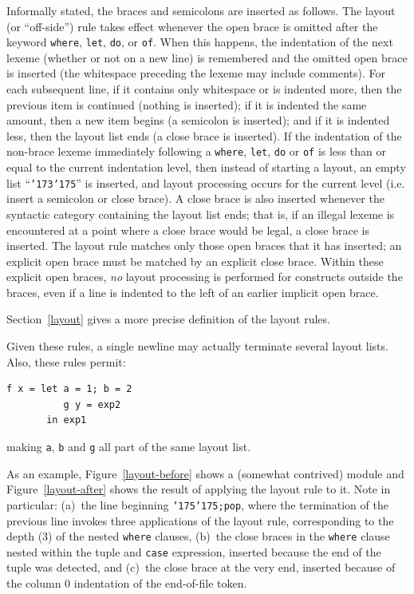 Informally stated, the braces and semicolons are inserted as follows.
The layout (or ``off-side'') rule takes effect
whenever the open brace is omitted after the keyword \mbox{\tt where}, \mbox{\tt let},
\mbox{\tt do}, or
\mbox{\tt of}.  When this happens, the indentation of the next lexeme (whether
or not on a new line) is remembered and the omitted open brace is
inserted (the whitespace preceding the lexeme may include comments).
For each subsequent line, if it contains only whitespace or is
indented more, then the previous item is continued (nothing is
inserted); if it is indented the same amount, then a new item begins
(a semicolon is inserted); and if it is indented less, then the
layout list ends (a close brace is inserted).  If the indentation of the 
non-brace lexeme immediately following a \mbox{\tt where}, \mbox{\tt let}, \mbox{\tt do} or \mbox{\tt of} is less 
than or equal to the current indentation level, then instead of starting 
a layout, an empty list ``\mbox{\tt {\char'173}{\char'175}}'' is inserted, and layout processing 
occurs for the current level (i.e. insert a semicolon or close brace). 
A close brace is
also inserted whenever the syntactic category containing the
layout list ends; that is, if an illegal lexeme is encountered at
a point where a close brace would be legal, a close brace is inserted.
The layout rule matches only those open braces that it has
inserted; an explicit open brace must be matched by
an explicit close brace.  Within these explicit open braces,
{\em no} layout processing is performed for constructs outside the
braces, even if a line is 
indented to the left of an earlier implicit open brace.

Section~\ref{layout} gives a more precise definition of the layout rules.

Given these rules, a single newline may actually terminate several
layout lists.  Also, these rules permit:
\bprog
{\small\begin{verbatim}
f x = let a = 1; b = 2 
          g y = exp2
       in exp1
\end{verbatim}}
\eprog
making \mbox{\tt a}, \mbox{\tt b} and \mbox{\tt g} all part of the same layout
list.

As an example, Figure~\ref{layout-before} shows a (somewhat contrived)
module and Figure~\ref{layout-after} shows the result of applying the
layout rule to it.  Note in particular: (a)~the line beginning \mbox{\tt {\char'175}{\char'175};pop},
where the termination of the previous line invokes three applications
of the layout rule, corresponding to the depth (3) of the nested
\mbox{\tt where} clauses, (b)~the close braces in the \mbox{\tt where} clause nested
within the tuple and \mbox{\tt case} expression, inserted because the end of the
tuple was detected, and (c)~the close brace at the very end, inserted
because of the column 0 indentation of the end-of-file token.

